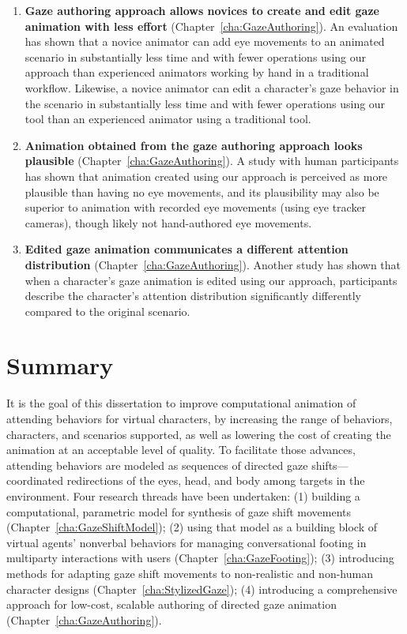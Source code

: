 \begin{enumerate}
\item \textbf{Gaze authoring approach allows novices to create and edit gaze animation with less effort} (Chapter~\ref{cha:GazeAuthoring}). An evaluation has shown that a novice animator can add eye movements to an animated scenario in substantially less time and with fewer operations using our approach than experienced animators working by hand in a traditional workflow. Likewise, a novice animator can edit a character's gaze behavior in the scenario in substantially less time and with fewer operations using our tool than an experienced animator using a traditional tool.
\item \textbf{Animation obtained from the gaze authoring approach looks plausible} (Chapter~\ref{cha:GazeAuthoring}). A study with human participants has shown that animation created using our approach is perceived as more plausible than having no eye movements, and its plausibility may also be superior to animation with recorded eye movements (using eye tracker cameras), though likely not hand-authored eye movements.
\item \textbf{Edited gaze animation communicates a different attention distribution} (Chapter~\ref{cha:GazeAuthoring}). Another study has shown that when a character's gaze animation is edited using our approach, participants describe the character's attention distribution significantly differently compared to the original scenario.
\end{enumerate}


\section{Summary}

It is the goal of this dissertation to improve computational animation of attending behaviors for virtual characters, by increasing the range of behaviors, characters, and scenarios supported, as well as lowering the cost of creating the animation at an acceptable level of quality. To facilitate those advances, attending behaviors are modeled as sequences of directed gaze shifts---coordinated redirections of the eyes, head, and body among targets in the environment. Four research threads have been undertaken: (1) building a computational, parametric model for synthesis of gaze shift movements (Chapter~\ref{cha:GazeShiftModel}); (2) using that model as a building block of virtual agents' nonverbal behaviors for managing conversational footing in multiparty interactions with users (Chapter~\ref{cha:GazeFooting}); (3) introducing methods for adapting gaze shift movements to non-realistic and non-human character designs (Chapter~\ref{cha:StylizedGaze}); (4) introducing a comprehensive approach for low-cost, scalable authoring of directed gaze animation (Chapter~\ref{cha:GazeAuthoring}).
